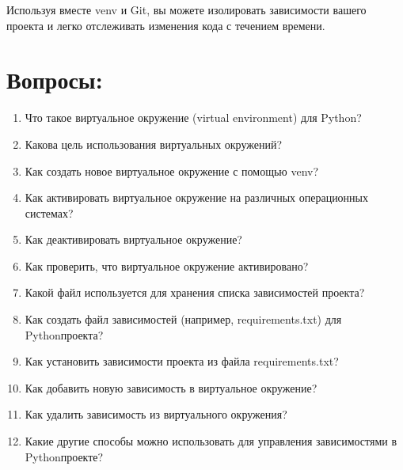 \documentclass[letterpaper,10pt,russian]{sphinxmanual}
\begin{document}
\sphinxAtStartPar
Используя вместе venv и Git, вы можете изолировать зависимости вашего проекта и легко отслеживать изменения кода с течением времени.

\sphinxstepscope


\section{Вопросы:}
\label{\detokenize{educational_materials/path_venv/quiz:id1}}\label{\detokenize{educational_materials/path_venv/quiz::doc}}\begin{enumerate}
%
\item {} 
\sphinxAtStartPar
Что такое виртуальное окружение (virtual environment) для Python?

\item {} 
\sphinxAtStartPar
Какова цель использования виртуальных окружений?

\item {} 
\sphinxAtStartPar
Как создать новое виртуальное окружение с помощью venv?

\item {} 
\sphinxAtStartPar
Как активировать виртуальное окружение на различных операционных системах?

\item {} 
\sphinxAtStartPar
Как деактивировать виртуальное окружение?

\item {} 
\sphinxAtStartPar
Как проверить, что виртуальное окружение активировано?

\item {} 
\sphinxAtStartPar
Какой файл используется для хранения списка зависимостей проекта?

\item {} 
\sphinxAtStartPar
Как создать файл зависимостей (например, requirements.txt) для Python\sphinxhyphen{}проекта?

\item {} 
\sphinxAtStartPar
Как установить зависимости проекта из файла requirements.txt?

\item {} 
\sphinxAtStartPar
Как добавить новую зависимость в виртуальное окружение?

\item {} 
\sphinxAtStartPar
Как удалить зависимость из виртуального окружения?

\item {} 
\sphinxAtStartPar
Какие другие способы можно использовать для управления зависимостями в Python\sphinxhyphen{}проекте?


\end{enumerate}
\end{document}
